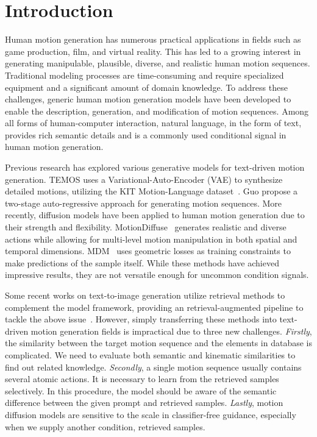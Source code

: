 \documentclass[10pt,twocolumn,letterpaper]{article}
\begin{document}
\section{Introduction}

Human motion generation has numerous practical applications in fields such as game production, film, and virtual reality. This has led to a growing interest in generating manipulable, plausible, diverse, and realistic human motion sequences.  Traditional modeling processes are time-consuming and require specialized equipment and a significant amount of domain knowledge. To address these challenges, generic human motion generation models have been developed to enable the description, generation, and modification of motion sequences. Among all forms of human-computer interaction, natural language, in the form of text, provides rich semantic details and is a commonly used conditional signal in human motion generation.




Previous research has explored various generative models for text-driven motion generation. TEMOS uses a Variational-Auto-Encoder (VAE) to synthesize detailed motions, utilizing the KIT Motion-Language dataset~\cite{plappert2016kit}. Guo \etal \cite{guo2022generating} propose a two-stage auto-regressive approach for generating motion sequences. More recently, diffusion models have been applied to human motion generation due to their strength and flexibility. MotionDiffuse~\cite{zhang2022motiondiffuse} generates realistic and diverse actions while allowing for multi-level motion manipulation in both spatial and temporal dimensions. MDM~\cite{tevet2022human} uses geometric losses as training constraints to make predictions of the sample itself. While these methods have achieved impressive results, they are not versatile enough for uncommon condition signals.


Some recent works on text-to-image generation utilize retrieval methods to complement the model framework, providing an retrieval-augmented pipeline to tackle the above issue~\cite{sheynin2022knn,chen2022re,blattmann2022retrieval}. However, simply transferring these methods into text-driven motion generation fields is impractical due to three new challenges. \textit{Firstly}, the similarity between the target motion sequence and the elements in database is complicated. We need to evaluate both semantic and kinematic similarities to find out related knowledge. \textit{Secondly}, a single motion sequence usually contains several atomic actions. It is necessary to learn from the retrieved samples selectively. In this procedure, the model should be aware of the semantic difference between the given prompt and retrieved samples. \textit{Lastly}, motion diffusion models are sensitive to the scale in classifier-free guidance, especially when we supply another condition, retrieved samples. 
\end{document}
